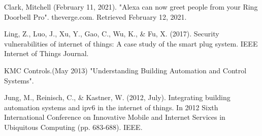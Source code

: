 \documentclass[conference]{IEEEtran}
\begin{document}
\begin{thebibliography}{00}
 Clark, Mitchell (February 11, 2021). "Alexa can now greet people from your Ring Doorbell Pro". theverge.com. Retrieved February 12, 2021.

Ling, Z., Luo, J., Xu, Y., Gao, C., Wu, K., \& Fu, X. (2017). Security vulnerabilities of internet of things: A case study of the smart plug system. IEEE Internet of Things Journal.

KMC Controls.(May 2013) "Understanding Building Automation and Control Systems". 

 Jung, M., Reinisch, C., \& Kastner, W. (2012, July). Integrating building automation systems and ipv6 in the internet of things. In 2012 Sixth International Conference on Innovative Mobile and Internet Services in Ubiquitous Computing (pp. 683-688). IEEE.


\end{thebibliography}
\end{document}
